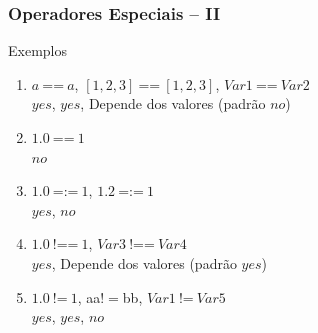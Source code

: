 \begin{frame}[fragile]

\frametitle{Operadores Especiais -- II}
    
	\begin{block}{Exemplos}
    	
    	\begin{enumerate}
    	
          \item $a\:$==$\:a$, \: $[1,2,3]\:$==$\:[1,2,3]$, \: $Var1\:$==$\:Var2$\\
          \pause
          $yes$, $yes$, Depende dos valores (padrão $no$)
          
          \pause
          \item $1.0\:$==$\:1$\\
          \pause
          $no$
          
          \pause
          \item $1.0\:$=:=$\:1$, \: $1.2\:$=:=$\:1$\\
          \pause
          $yes$, $no$
          
          \pause
          \item $1.0\:$!==$\:1$, \: $Var3\:$!==$\:Var4$\\
          \pause
          $yes$, Depende dos valores (padrão $yes$)
          \pause

          \item $1.0\:$!=$\:1$, \: aa\:$!=$\:bb, \: $Var1\:$!=$\:Var5$\\
          \pause
          $yes$, $yes$, $no$
          
        \end{enumerate}
	\end{block}


\end{frame}

